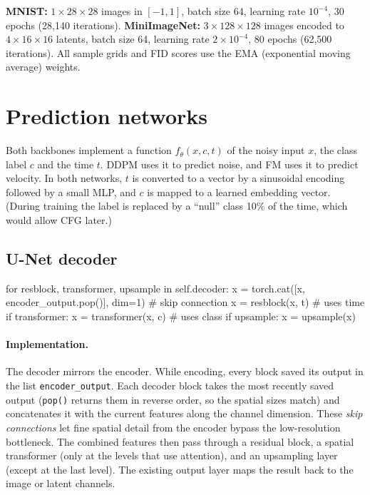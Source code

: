 \documentclass[11pt]{article}
\begin{document}
\textbf{MNIST:} $1\times28\times28$ images in $[-1,1]$, batch size 64, learning rate $10^{-4}$,
30 epochs (28{,}140 iterations).
\textbf{MiniImageNet:} $3\times128\times128$ images encoded to $4\times16\times16$ latents, batch
size 64, learning rate $2\times10^{-4}$, 80 epochs (62{,}500 iterations). All sample grids and FID
scores use the EMA (exponential moving average) weights.

\section{Prediction networks}
Both backbones implement a function $f_\theta(x, c, t)$ of the noisy input $x$, the class label $c$
and the time $t$. DDPM uses it to predict noise, and FM uses it to predict velocity. In both
networks, $t$ is converted to a vector by a sinusoidal encoding followed by a small MLP, and $c$ is
mapped to a learned embedding vector. (During training the label is replaced by a ``null'' class 10\%
of the time, which would allow CFG later.)

\subsection{U-Net decoder}
\begin{codeblock}
for resblock, transformer, upsample in self.decoder:
    x = torch.cat([x, encoder_output.pop()], dim=1)   # skip connection
    x = resblock(x, t)                                # uses time
    if transformer:
        x = transformer(x, c)                         # uses class
    if upsample:
        x = upsample(x)
\end{codeblock}
\paragraph{Implementation.} The decoder mirrors the encoder. While encoding, every block saved its output
in the list \texttt{encoder\_output}. Each decoder block takes the most recently saved output
(\texttt{pop()} returns them in reverse order, so the spatial sizes match) and concatenates it with
the current features along the channel dimension. These \emph{skip connections} let fine spatial
detail from the encoder bypass the low-resolution bottleneck. The combined features then pass through
a residual block, a spatial transformer (only at the levels that use attention), and an upsampling
layer (except at the last level). The existing output layer maps the result back to the image or
latent channels.
\end{document}
